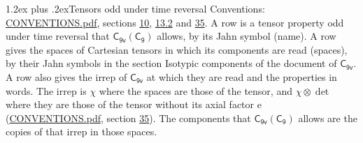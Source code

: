 \documentclass[10pt,a4paper]{article}
\makeatletter
\renewcommand\section{\@startsection{section}{1}{\z@}{-3ex plus -1ex minus -.2ex}%
  {1.2ex plus .2ex}{\normalfont\large\sffamily\bfseries\color{parttitle}}}
\numberwithin{equation}{section}
\newcommand{\grp}[1]{\mathsf{#1}}
\newcommand{\irrprod}{\otimes}
\makeatother
\begin{document}
\section{Tensors odd under time reversal}\label{s:time_odd}
Conventions: \href{../../CONVENTIONS.pdf}{CONVENTIONS.pdf}, sections \href{../../../rotation/CONVENTIONS.pdf\#conv.10}{10}, \href{../../../rotation/CONVENTIONS.pdf\#conv.13.2}{13.2} and \href{../../CONVENTIONS.pdf\#conv.35}{35}.
\leavevmode\label{n:head.name.property}A row is a tensor property odd under time reversal that $\grp{C_{9v}}(\grp{C_{9}})$ allows, by its Jahn symbol (name). \label{n:head.spaces}A row gives the spaces of Cartesian tensors in which its components are read (spaces), by their Jahn symbols in the section Isotypic components of the document of \href{../../../rotation/data/pdf/C9v.pdf}{$\grp{C_{9v}}$}. \label{n:head.properties}A row also gives the irrep of $\grp{C_{9v}}$ at which they are read and the properties in words. The irrep is $\chi$ where the spaces are those of the tensor, and $\chi \irrprod \det$ where they are those of the tensor without its axial factor e (\href{../../CONVENTIONS.pdf}{CONVENTIONS.pdf}, section \href{../../CONVENTIONS.pdf\#conv.35}{35}). The components that $\grp{C_{9v}}(\grp{C_{9}})$ allows are the copies of that irrep in those spaces.
\end{document}
